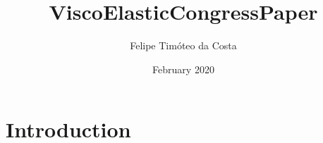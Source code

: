 \documentclass{article}
\title{ViscoElasticCongressPaper}
\author{Felipe Timóteo da Costa}
\date{February 2020}
\begin{document}
\maketitle

\section{Introduction}
\end{document}

